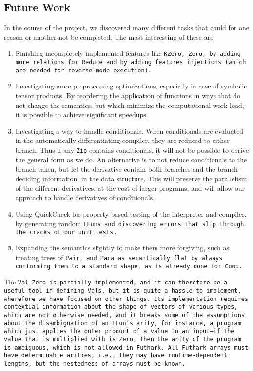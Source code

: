 \subsection{Future Work}
In the course of the project, we discovered many different tasks that could for one
reason or another not be completed. The most interesting of these are:

\begin{enumerate}
\item Finishing incompletely implemented features like \tt{KZero}, \tt{Zero}, by
adding more relations for \tt{Reduce} and by adding features injections (which
are needed for reverse-mode execution).
\item Investigating more preprocessing optimizations, especially in case of symbolic
tensor products. By reordering the application of functions in ways that do not
change the semantics, but which minimize the computational work-load, it is possible
to achieve significant speedups.
\item Investigating a way to handle conditionals. When conditionals are evaluated in
the automatically differentiating compiler, they are reduced to either branch. Thus
if any \texttt{Zip} contains conditionals, it will not be possible to derive the general form
as we do. An alternative is to not reduce conditionals to the branch taken, but let
the derivative contain both branches and the branch-deciding information, in the
data structure. This will preserve the parallelism of the different derivatives, at
the cost of larger programs, and will allow our approach to handle derivatives of
conditionals.
\item Using QuickCheck for property-based testing of the interpreter and compiler,
by generating random \tt{LFun}s and discovering errors that slip through the cracks
of our unit tests.
\item Expanding the semantics slightly to make them more forgiving, such as treating
trees of \tt{Pair}, and \tt{Para} as semantically flat by always conforming them to
a standard shape, as is already done for \tt{Comp}.
\end{enumerate}

The \tt{Val} \tt{Zero} is partially implemented, and it can therefore be a useful tool in
defining \tt{Val}s, but it is quite a hassle to implement, wherefore we have focused on
other things. Its implementation requires contextual information about the shape of
vectors of various types, which are not otherwise needed, and it breaks some of the
assumptions about the disambiguation of an \texttt{LFun}'s arity, for instance, a program
which just applies the outer product of a value to an input---if the value that is
multiplied with is \texttt{Zero}, then the arity of the program is ambiguous, which is not
allowed in Futhark. All Futhark arrays must have determinable arities, i.e., they may
have runtime-dependent lengths, but the nestedness of arrays must be known.


